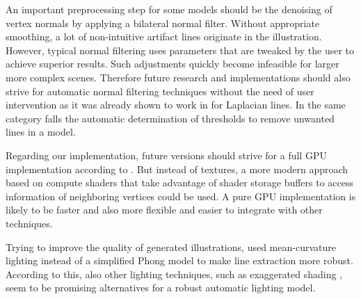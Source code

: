 \documentclass[9pt,fleqn,twoside,twocolumn]{stdglobal}
\begin{document}
  An important preprocessing step for some models should be the denoising of vertex normals by applying a bilateral normal filter.
  Without appropriate smoothing, a lot of non-intuitive artifact lines originate in the illustration.
  However, typical normal filtering uses parameters that are tweaked by the user to achieve superior results.
  Such adjustments quickly become infeasible for larger more complex scenes.
  Therefore future research and implementations should also strive for automatic normal filtering techniques without the need of user intervention as it was already shown to work in \textcite{zhang2011} for Laplacian lines.
  In the same category falls the automatic determination of thresholds to remove unwanted lines in a model.

  Regarding our implementation, future versions should strive for a full GPU implementation according to \textcite{zhang2010}.
  But instead of textures, a more modern approach based on compute shaders that take advantage of shader storage buffers to access information of neighboring vertices could be used.
  A pure GPU implementation is likely to be faster and also more flexible and easier to integrate with other techniques.

  Trying to improve the quality of generated illustrations, \citeauthor{zhang2010} used mean-curvature lighting \autocite{kindlmann2003,kolomenkin2008} instead of a simplified Phong model to make line extraction more robust.
  According to this, also other lighting techniques, such as exaggerated shading \autocite{rusinkiewicz2006}, seem to be promising alternatives for a robust automatic lighting model.

\nocite{*}
\AtNextBibliography{\footnotesize}
\printbibliography[heading=bibintoc]

\appendix
\end{document}
